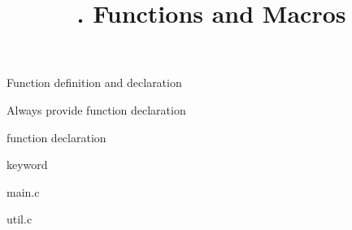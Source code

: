 

\title{. Functions and Macros}




\frame{\titlepage}
\begin{frame}{Function definition and declaration}
\end{frame}
\begin{frame}{Always provide function declaration}
    
\end{frame}
\begin{frame}{ function declaration}
    
\end{frame}
\begin{frame}{ keyword}
    \begin{block}{main.c}
        
    \end{block}
    \begin{block}{util.c}
        
    \end{block}
\end{frame}
